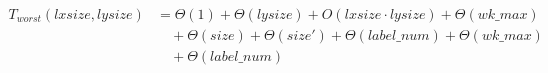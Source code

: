 \begin{align}
\label{eq:analyse-arlabeling-all-1}
T_{worst}(\mathit{lxsize},\mathit{lysize})& =
\Theta(1)
+ \Theta(\mathit{lysize})
+ O(\mathit{lxsize}\cdot\mathit{lysize})
+ \Theta(\mathit{wk\_max})
\\
& \quad
+ \Theta(\mathit{size})
+ \Theta(\mathit{size}')
+ \Theta(\mathit{label\_num})
+ \Theta(\mathit{wk\_max})
\nonumber \\
& \quad
+ \Theta(\mathit{label\_num})
\nonumber
\end{align}
